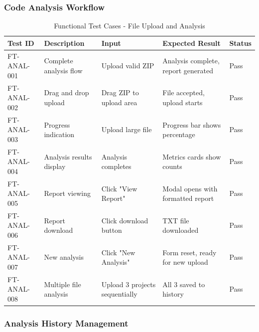 \documentclass[12pt,a4paper]{article}
\begin{document}
    \subsubsection{Code Analysis Workflow}

    \begin{table}[H]
        \caption{Functional Test Cases - File Upload and Analysis}
        \begin{tabular}{|p{2cm}|p{4cm}|p{3cm}|p{3cm}|p{1.5cm}|}
            \hline
            \textbf{Test ID} & \textbf{Description} & \textbf{Input} & \textbf{Expected Result} & \textbf{Status} \\
            \hline
            FT-ANAL-001 & Complete analysis flow & Upload valid ZIP & Analysis complete, report generated & Pass \\
            \hline
            FT-ANAL-002 & Drag and drop upload & Drag ZIP to upload area & File accepted, upload starts & Pass \\
            \hline
            FT-ANAL-003 & Progress indication & Upload large file & Progress bar shows percentage & Pass \\
            \hline
            FT-ANAL-004 & Analysis results display & Analysis completes & Metrics cards show counts & Pass \\
            \hline
            FT-ANAL-005 & Report viewing & Click "View Report" & Modal opens with formatted report & Pass \\
            \hline
            FT-ANAL-006 & Report download & Click download button & TXT file downloaded & Pass \\
            \hline
            FT-ANAL-007 & New analysis & Click "New Analysis" & Form reset, ready for new upload & Pass \\
            \hline
            FT-ANAL-008 & Multiple file analysis & Upload 3 projects sequentially & All 3 saved to history & Pass \\
            \hline
        \end{tabular}
    \end{table}

    \subsubsection{Analysis History Management}
\end{document}

